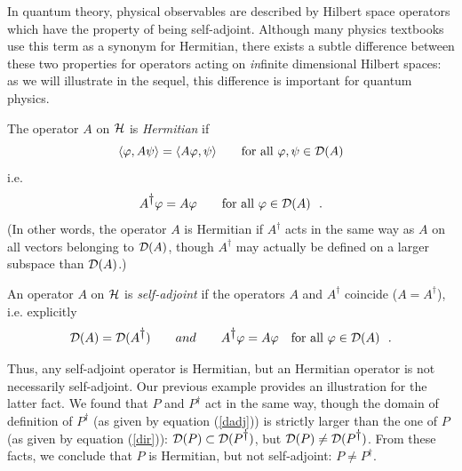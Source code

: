 \documentclass[12pt]{report}
\begin{document}
In quantum theory,  
physical observables are described by Hilbert space operators 
which have the property of being self-adjoint.
Although many physics textbooks use 
this term as a synonym for Hermitian,
there exists a subtle difference between these two 
properties for operators acting on {\em in}finite dimensional 
Hilbert spaces: as we will illustrate in the sequel,
this difference 
is important for quantum physics.  
\begin{defin}
The operator $A$ on $\hs$ is {\em Hermitian} if 
\begin{equation}
\langle \varphi , A \psi \rangle  =
\langle A \varphi , \psi \rangle
\qquad \mbox{for all} \ \varphi, \psi \in {\cal D}(A)
\end{equation}
i.e.  
\[
A^{\dag} \varphi = A  \varphi
\qquad \mbox{for all} \ \varphi \in {\cal D}(A)
\ \ .
\]
(In other words, the operator $A$ is Hermitian if $A^{\dag}$
acts in the same way as $A$ on all vectors belonging to ${\cal D}(A)$,
though $A^{\dag}$ may actually be defined on a larger 
subspace  than ${\cal D}(A)$.) 
 
An operator $A$ on $\hs$ is
{\em self-adjoint} if the operators 
$A$ and $A^{\dag}$  coincide ($A= A^{\dag}$), i.e. 
explicitly  
\begin{equation}
{\cal D} (A) = {\cal D} (A^{\dag})
\qquad 
and \qquad 
A^{\dag} \varphi = A  \varphi
\quad \mbox{for all} \ \varphi \in {\cal D}(A)
\ \ .
\end{equation}
\end{defin}
Thus, any self-adjoint operator is Hermitian, but 
an Hermitian operator is not necessarily self-adjoint.
Our previous example provides an  
illustration for the latter fact. 
We found that $P$ and $P^{\dag}$ act in the same way, though 
the domain of definition 
of $P^{\dag}$ (as given by equation (\ref{dadj}))
is strictly larger than the one of $P$ 
(as given by equation (\ref{dir})):
${\cal D}(P) \subset {\cal D}(P^{\dag})$, but 
${\cal D}(P) \neq {\cal D}(P^{\dag})$.
From these facts, we conclude that $P$ is Hermitian, 
but not self-adjoint:
$P \neq P^{\dag}$. 
\end{document}
